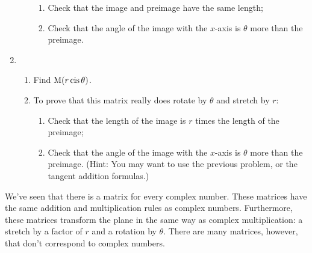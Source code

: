 \documentclass[../gatm.tex]{subfiles}
\begin{document}
\begin{enumerate}
\begin{enumerate}
\begin{enumerate}
\item Check that the image and preimage have the same length;
\item Check that the angle of the image with the $x$-axis is $\theta$ more than the preimage.
\end{enumerate}
\end{enumerate}
\item \begin{enumerate}
\item Find $\operatorname{M} (r\operatorname{cis}\theta)$.
\item To prove that this matrix really does rotate by $\theta$ and stretch by $r$:
\begin{enumerate}
\item Check that the length of the image is $r$ times the length of the preimage;
\item Check that the angle of the image with the $x$-axis is $\theta$ more than the preimage. (Hint: You may want to use the previous problem, or the tangent addition formulas.)
\end{enumerate}
\end{enumerate}
\setcounter{problem_i}{\value{enumi}}
\end{enumerate}

\noindent We've seen that there is a matrix for every complex number. These matrices have the same addition and multiplication rules as complex numbers. Furthermore, these matrices transform the plane in the same way as complex multiplication: a stretch by a factor of $r$ and a rotation by $\theta$. There are many matrices, however, that don't correspond to complex numbers.
\end{document}
